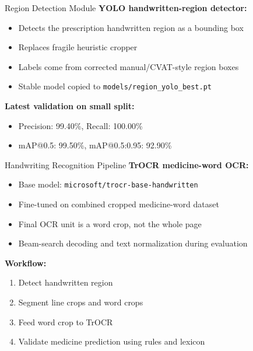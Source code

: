 \documentclass{beamer}
\begin{document}
\begin{frame}{Region Detection Module}
\textbf{YOLO handwritten-region detector:}
\begin{itemize}
    \item Detects the prescription handwritten region as a bounding box
    \item Replaces fragile heuristic cropper
    \item Labels come from corrected manual/CVAT-style region boxes
    \item Stable model copied to \texttt{models/region\_yolo\_best.pt}
\end{itemize}

\vspace{0.1cm}
\textbf{Latest validation on small split:}
\begin{itemize}
    \item Precision: 99.40\%, Recall: 100.00\%
    \item mAP@0.5: 99.50\%, mAP@0.5:0.95: 92.90\%
\end{itemize}

\end{frame}

\begin{frame}{Handwriting Recognition Pipeline}
\textbf{TrOCR medicine-word OCR:}
\begin{itemize}
    \item Base model: \texttt{microsoft/trocr-base-handwritten}
    \item Fine-tuned on combined cropped medicine-word dataset
    \item Final OCR unit is a word crop, not the whole page
    \item Beam-search decoding and text normalization during evaluation
\end{itemize}

\textbf{Workflow:}
\begin{enumerate}
    \item Detect handwritten region
    \item Segment line crops and word crops
    \item Feed word crop to TrOCR
    \item Validate medicine prediction using rules and lexicon
\end{enumerate}
\end{frame}
\end{document}
